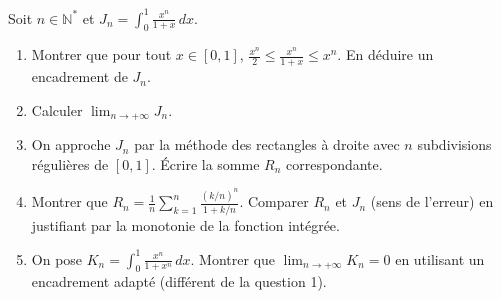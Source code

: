 \documentclass[11pt]{article}
\begin{document}
\begin{exercice}
Soit $n \in \mathbb{N}^*$ et $J_n = \int_0^1 \frac{x^n}{1+x} \, dx$.
\begin{enumerate}
    \item Montrer que pour tout $x \in [0, 1]$, $\frac{x^n}{2} \le \frac{x^n}{1+x} \le x^n$. En déduire un encadrement de $J_n$.
    \item Calculer $\lim_{n \to +\infty} J_n$.
    \item On approche $J_n$ par la méthode des rectangles à droite avec $n$ subdivisions régulières de $[0, 1]$. Écrire la somme $R_n$ correspondante.
    \item Montrer que $R_n = \frac{1}{n} \sum_{k=1}^n \frac{(k/n)^n}{1+k/n}$. Comparer $R_n$ et $J_n$ (sens de l'erreur) en justifiant par la monotonie de la fonction intégrée.
    \item On pose $K_n = \int_0^1 \frac{x^n}{1+x^n} \, dx$. Montrer que $\lim_{n \to +\infty} K_n = 0$ en utilisant un encadrement adapté (différent de la question 1).
\end{enumerate}
\end{exercice}
\end{document}
